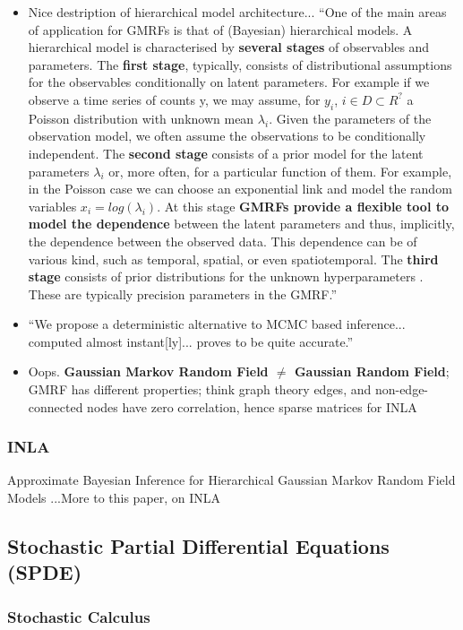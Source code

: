 \documentclass{article}
\begin{document}
\begin{itemize}
 \item Nice destription of hierarchical model architecture... ``One of the main areas of application for GMRFs is that of (Bayesian) hierarchical models. A hierarchical model is characterised by {\bf several stages} of observables and parameters. The {\bf first stage}, typically, consists of distributional assumptions for the observables conditionally on latent parameters. For example if we observe a time series of counts y, we may assume, for $y_{i}$, $i \in D \subset R^{?}$ a Poisson distribution with unknown mean  $\lambda_{i}$. Given the parameters of the observation model, we often assume the observations to be conditionally independent. The {\bf second stage} consists of a prior model for the latent parameters $\lambda_{i}$ or, more often, for a particular function of them. For example, in the Poisson case we can choose an exponential link and model the random variables $x_{i} = log(\lambda_{i})$. At this stage {\bf GMRFs provide a flexible tool to model the dependence} between the latent parameters and thus, implicitly, the dependence between the observed data. This dependence can be of various kind, such as temporal, spatial, or even spatiotemporal. The {\bf third stage} consists of prior distributions for the unknown hyperparameters  . These are typically precision parameters in the GMRF.''
 \item ``We propose a deterministic alternative to MCMC based inference... computed almost instant[ly]... proves to be quite accurate.''
 \item Oops. {\bf Gaussian Markov Random Field $\neq$ Gaussian Random Field}; \\
 GMRF has different properties; think graph theory edges, and non-edge-connected nodes have zero correlation, hence sparse matrices for INLA
\end{itemize}

\subsubsection{INLA}


Approximate Bayesian Inference for Hierarchical Gaussian Markov Random Field Models \citep{Rue2007} ...More to this paper, on INLA

\subsection{Stochastic Partial Differential Equations (SPDE)}

\subsubsection{Stochastic Calculus}
\end{document}
